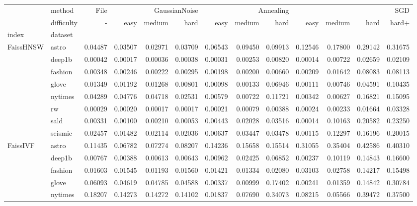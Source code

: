 \begin{tabular}{llrrrrrrrrrrr}
\toprule
 & method & File & \multicolumn{3}{r}{GaussianNoise} & \multicolumn{3}{r}{Annealing} & \multicolumn{4}{r}{SGD} \\
 & difficulty & - & easy & medium & hard & easy & medium & hard & easy & medium & hard & hard+ \\
index & dataset &  &  &  &  &  &  &  &  &  &  &  \\
\midrule
\multirow[t]{8}{*}{FaissHNSW} & astro & 0.04487 & 0.03507 & 0.02971 & 0.03709 & 0.06543 & 0.09450 & 0.09913 & 0.12546 & 0.17800 & 0.29142 & 0.31675 \\
 & deep1b & 0.00042 & 0.00017 & 0.00036 & 0.00038 & 0.00031 & 0.00253 & 0.00820 & 0.00014 & 0.00722 & 0.02659 & 0.02109 \\
 & fashion & 0.00348 & 0.00246 & 0.00222 & 0.00295 & 0.00198 & 0.00200 & 0.00660 & 0.00209 & 0.01642 & 0.08083 & 0.08113 \\
 & glove & 0.01349 & 0.01192 & 0.01268 & 0.00801 & 0.00098 & 0.00133 & 0.06946 & 0.00111 & 0.00746 & 0.04591 & 0.10435 \\
 & nytimes & 0.04289 & 0.04776 & 0.04718 & 0.02531 & 0.00579 & 0.00722 & 0.11721 & 0.00342 & 0.00627 & 0.16821 & 0.15095 \\
 & rw & 0.00029 & 0.00020 & 0.00017 & 0.00017 & 0.00021 & 0.00079 & 0.00388 & 0.00024 & 0.00233 & 0.01664 & 0.03328 \\
 & sald & 0.00331 & 0.00100 & 0.00210 & 0.00053 & 0.00443 & 0.02028 & 0.03516 & 0.00014 & 0.10163 & 0.20582 & 0.23250 \\
 & seismic & 0.02457 & 0.01482 & 0.02114 & 0.02036 & 0.00637 & 0.03447 & 0.03478 & 0.00115 & 0.12297 & 0.16196 & 0.20015 \\
\cline{1-13}
\multirow[t]{8}{*}{FaissIVF} & astro & 0.11435 & 0.06782 & 0.07274 & 0.08207 & 0.14236 & 0.15658 & 0.15514 & 0.31055 & 0.35404 & 0.42586 & 0.40310 \\
 & deep1b & 0.00767 & 0.00388 & 0.00613 & 0.00643 & 0.00962 & 0.02425 & 0.06852 & 0.00237 & 0.10119 & 0.14843 & 0.16600 \\
 & fashion & 0.01603 & 0.01545 & 0.01193 & 0.01560 & 0.01421 & 0.01334 & 0.02080 & 0.03103 & 0.02758 & 0.14217 & 0.15498 \\
 & glove & 0.06093 & 0.04619 & 0.04785 & 0.04588 & 0.00337 & 0.00999 & 0.17402 & 0.00241 & 0.01359 & 0.14842 & 0.30784 \\
 & nytimes & 0.18207 & 0.14273 & 0.14272 & 0.14102 & 0.01837 & 0.07690 & 0.34073 & 0.08215 & 0.05566 & 0.39472 & 0.37500 \\

\end{tabular}
